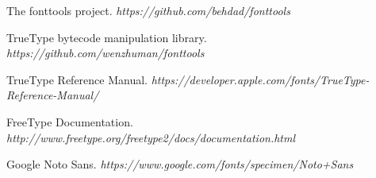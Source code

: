 \documentclass[12pt]{article}
\begin{document}
\clearpage
\begin{thebibliography}{1}

 The fonttools project. {\em https://github.com/behdad/fonttools } 

 TrueType bytecode manipulation library. 
{\em https://github.com/wenzhuman/fonttools } 

 TrueType Reference Manual. 
{\em https://developer.apple.com/fonts/TrueType-Reference-Manual/ } 

 FreeType Documentation.
{\em http://www.freetype.org/freetype2/docs/documentation.html }

 Google Noto Sans. 
{\em https://www.google.com/fonts/specimen/Noto+Sans } 

\end{thebibliography}
\end{document}
